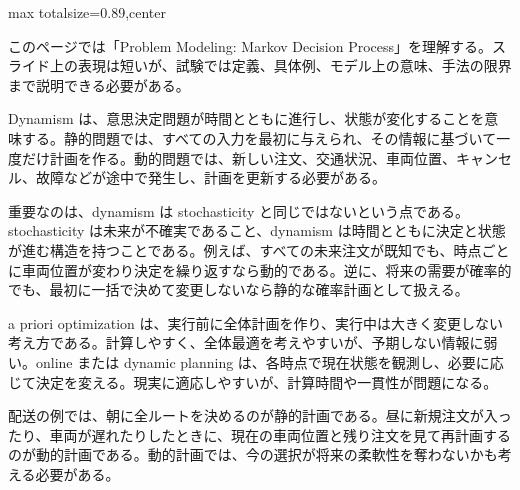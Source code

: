 \begin{minipage}[t]{0.58\textwidth}
\begin{adjustbox}{max totalsize={\textwidth}{0.89\textheight},center}
\begin{minipage}{\textwidth}\scriptsize
{}このページでは「Problem Modeling: Markov Decision Process」を理解する。スライド上の表現は短いが、試験では定義、具体例、モデル上の意味、手法の限界まで説明できる必要がある。\par
Dynamism は、意思決定問題が時間とともに進行し、状態が変化することを意味する。静的問題では、すべての入力を最初に与えられ、その情報に基づいて一度だけ計画を作る。動的問題では、新しい注文、交通状況、車両位置、キャンセル、故障などが途中で発生し、計画を更新する必要がある。\par
重要なのは、dynamism は stochasticity と同じではないという点である。stochasticity は未来が不確実であること、dynamism は時間とともに決定と状態が進む構造を持つことである。例えば、すべての未来注文が既知でも、時点ごとに車両位置が変わり決定を繰り返すなら動的である。逆に、将来の需要が確率的でも、最初に一括で決めて変更しないなら静的な確率計画として扱える。\par
a priori optimization は、実行前に全体計画を作り、実行中は大きく変更しない考え方である。計算しやすく、全体最適を考えやすいが、予期しない情報に弱い。online または dynamic planning は、各時点で現在状態を観測し、必要に応じて決定を変える。現実に適応しやすいが、計算時間や一貫性が問題になる。\par
配送の例では、朝に全ルートを決めるのが静的計画である。昼に新規注文が入ったり、車両が遅れたりしたときに、現在の車両位置と残り注文を見て再計画するのが動的計画である。動的計画では、今の選択が将来の柔軟性を奪わないかも考える必要がある。\par

\end{minipage}
\end{adjustbox}
\end{minipage}
